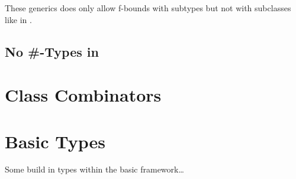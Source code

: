 These generics does only allow f-bounds with subtypes but not with
subclasses like in \ooplss. 

\subsection{No \#-Types in \ooplss}
\cite{bruce_foundations_2002}

\section{Class Combinators}

\section{Basic Types}
Some build in types within the basic framework\ldots


